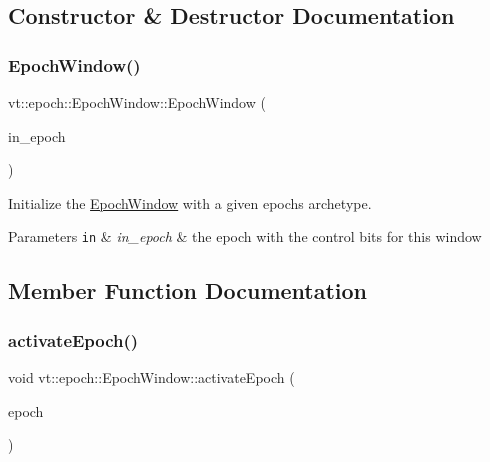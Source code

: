 \subsection{Constructor \& Destructor Documentation}
\mbox{\label{structvt_1_1epoch_1_1_epoch_window_ab0d58ee25bf04051ac80ff32a4fcd8e5}} 
\subsubsection{\texorpdfstring{Epoch\+Window()}{EpochWindow()}}
{\footnotesize\ttfamily vt\+::epoch\+::\+Epoch\+Window\+::\+Epoch\+Window (\begin{DoxyParamCaption}\item[{\hyperlink{namespacevt_a985a5adf291c34a3ca263b3378388236}{Epoch\+Type}}]{in\+\_\+epoch }\end{DoxyParamCaption})\hspace{0.3cm}{\ttfamily [explicit]}}



Initialize the {\ttfamily \hyperlink{structvt_1_1epoch_1_1_epoch_window}{Epoch\+Window}} with a given epoch\textquotesingle{}s archetype. 


\begin{DoxyParams}[1]{Parameters}
\mbox{\tt in}  & {\em in\+\_\+epoch} & the epoch with the control bits for this window \\
\hline
\end{DoxyParams}


\subsection{Member Function Documentation}
\mbox{\label{structvt_1_1epoch_1_1_epoch_window_a6efc8f11ec346d89ebbfcb36069b6e78}} 
\subsubsection{\texorpdfstring{activate\+Epoch()}{activateEpoch()}}
{\footnotesize\ttfamily void vt\+::epoch\+::\+Epoch\+Window\+::activate\+Epoch (\begin{DoxyParamCaption}\item[{\hyperlink{namespacevt_a985a5adf291c34a3ca263b3378388236}{Epoch\+Type}}]{epoch }\end{DoxyParamCaption})}




